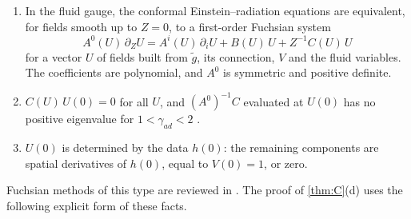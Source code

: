 \documentclass[11pt]{article}
\theoremstyle{canonmath}
\theoremstyle{canonpostulate}
\theoremstyle{canonproposition}
\theoremstyle{canonmath}
\theoremstyle{canonproposition}
\def\mathrm#1{#1}%
\def\mathbf#1{#1}%
\begin{document}
\begin{enumerate}[label=(AT\arabic*)]
\item In the fluid gauge, the conformal Einstein--radiation equations are equivalent, for fields smooth up to $Z = 0$, to a first-order Fuchsian system
\begin{equation}
A^0(\mathbf{U})\,\partial_Z\mathbf{U} = A^i(\mathbf{U})\,\partial_i\mathbf{U} + B(\mathbf{U})\,\mathbf{U} + Z^{-1}C(\mathbf{U})\,\mathbf{U}
\label{eq:fuchs}
\end{equation}
for a vector $\mathbf{U}$ of fields built from $\tilde g$, its connection, $V$ and the fluid variables. The coefficients are polynomial, and $A^0$ is symmetric and positive definite.
\item $C(\mathbf{U})\,\mathbf{U}(0) = 0$ for all $\mathbf{U}$, and $(A^0)^{-1}C$ evaluated at $\mathbf{U}(0)$ has no positive eigenvalue for $1<\gamma_{\mathrm{ad}}<2$ \cite[§4.3, (70) and the paragraph following it]{AnguigeTod1999a}.
\item $\mathbf{U}(0)$ is determined by the data $h(0)$: the remaining components are spatial derivatives of $h(0)$, equal to $V(0) = 1$, or zero.
\end{enumerate}
Fuchsian methods of this type are reviewed in \cite{Rendall2004}. The proof of \cref{thm:C}(d) uses the following explicit form of these facts.
\end{document}
